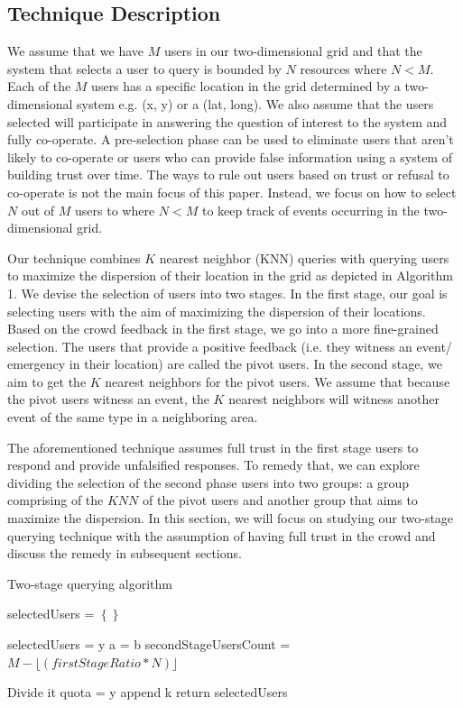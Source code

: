 \documentclass{acm_proc_article-sp}
\newcommand\floor[1]{\lfloor#1\rfloor}
\begin{document}
\subsection{Technique Description}
We assume that we have $M$ users in our two-dimensional grid and that the system that selects a user to query is bounded by $N$ resources where $N < M$.  Each of the $M$ users has a specific location in the grid determined by a two-dimensional system e.g. (x, y) or a (lat, long). We also assume that the users selected will participate in answering the question of interest to the system and fully co-operate. A pre-selection phase can be used to eliminate users that aren't likely to co-operate or users who can provide false information using a system of building trust over time. The ways to rule out users based on trust or refusal to co-operate is not the main focus of this paper. Instead, we focus on how to select $N$ out of $M$ users to  where $N < M$ to keep track of events occurring in the two-dimensional grid.\par
Our technique combines $K$ nearest neighbor (KNN) queries with querying users to maximize the dispersion of their location in the grid as depicted in Algorithm 1. We devise the selection of users into two stages. In the first stage, our goal is selecting users with the aim of maximizing the dispersion of their locations. Based on the crowd feedback in the first stage, we go into a more fine-grained selection. The users that provide a positive feedback (i.e. they witness an event/ emergency in their location) are called the pivot users. In the second stage, we aim to get the $K$ nearest neighbors for the pivot users. We assume that because the pivot users witness an event, the $K$ nearest neighbors will witness another event of the same type in a neighboring area. \par
The aforementioned technique assumes full trust in the first stage users to respond and provide unfalsified responses. To remedy that, we can explore dividing the selection of the second phase users into two groups: a group comprising of the $KNN$ of the pivot users and another group that aims to maximize the dispersion. In this section, we will focus on studying our two-stage querying technique with the assumption of having full trust in the crowd and discuss the remedy in subsequent sections.\par  
\begin{algorithm}
\caption{Two-stage querying algorithm}
\label{TSalgorithm}
	\begin{algorithmic}[1]
			\State selectedUsers = $\left\{\right\}$
			
				\State selectedUsers = y
			\ELSE 
				\State a = b
			\ENDIF	
\State  secondStageUsersCount = $M -  \floor{(firstStageRatio*N)}$

\State Divide it
\ELSE 
\State quota = y
\ENDIF	
\State append k
\State return {selectedUsers} 
\EndFunction
\end{algorithmic}

\end{algorithm}
\end{document}
